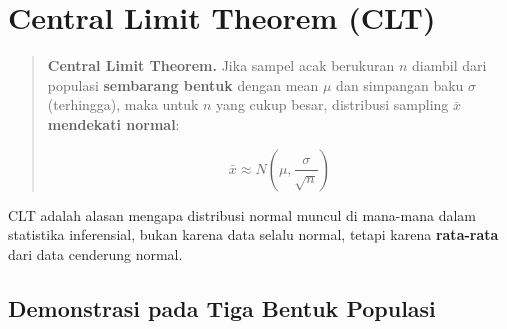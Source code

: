 \documentclass[
  indonesian,
  letterpaper,
]{book}
\begin{document}

\chapter{Central Limit Theorem (CLT)}\label{central-limit-theorem-clt}

\begin{quote}
\textbf{Central Limit Theorem.} Jika sampel acak berukuran \(n\) diambil
dari populasi \textbf{sembarang bentuk} dengan mean \(\mu\) dan
simpangan baku \(\sigma\) (terhingga), maka untuk \(n\) yang cukup
besar, distribusi sampling \(\bar{x}\) \textbf{mendekati normal}:

\[
\bar{x} \approx N\left(\mu, \frac{\sigma}{\sqrt{n}}\right)
\]
\end{quote}

CLT adalah alasan mengapa distribusi normal muncul di mana-mana dalam
statistika inferensial, bukan karena data selalu normal, tetapi karena
\textbf{rata-rata} dari data cenderung normal.

\section{Demonstrasi pada Tiga Bentuk
Populasi}\label{demonstrasi-pada-tiga-bentuk-populasi}
\end{document}
